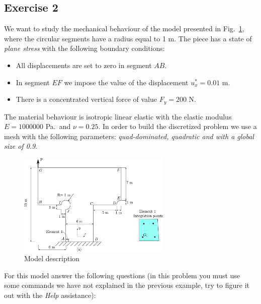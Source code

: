 \newpage
\subsection{Exercise 2}

We want to study the mechanical behaviour of the model presented in Fig.~\ref{figu116}, where the circular segments have a radius equal to 1 m. The piece has a state of \textit{plane stress} with the following boundary conditions:
\begin{itemize}
\item All displacements are set to zero in segment $AB$.
\item In segment $EF$ we impose the value of the displacement $u_x^*=0.01$ m.
\item There is a concentrated vertical force of value $F_y=200$ N.
\end{itemize}

The material behaviour is isotropic linear elastic with the elastic modulus $E=1000000$ Pa.~and $\nu=0.25$. In order to build the discretized problem we use a mesh with the following parameters: \textit{quad-dominated, quadratic and with a global size of 0.9}.

\begin{figure}[!h]
  \begin{center}
    \includegraphics[width=0.65\textwidth]{./body/images/imagen116}
  \end{center}
  \caption{Model description}
  \label{figu116}
\end{figure}

For this model answer the following questions (in this problem you must use some commands we have not explained in the previous example, try to figure it out with the \textit{Help} assistance):



